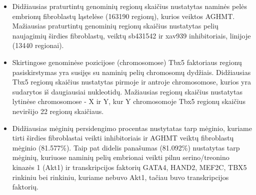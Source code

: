 \documentclass[12pt]{article}
\begin{document}
\begin{itemize}
    \item Didžiausias praturtintų genominių regionų skaičius nustatytas naminės
        pelės embrionų fibroblastų ląstelėse (163190 regionų), kurios veiktos
        AGHMT. Mažiausias praturtintų genominių regionų skaičius nustatytas
        pelių naujagimių širdies fibroblastų, veiktų sb431542 ir xav939
        inhibitoriais, linijoje (13440 regionai).
    \item Skirtingose genominėse pozicijose (chromosomose) Tbx5 faktoriaus
        regionų pasiskirstymas yra susijęs su naminių pelių chromosomų dydžiais.
        Didžiausias Tbx5 regionų skaičius nustatytas pirmoje ir antroje
        chromosomose, kurios yra sudarytos iš daugiausiai nukleotidų.
        Mažiausias regionų skaičius nustatytas lytinėse chromosomose - X ir Y,
        kur Y chromosomoje Tbx5 regionų skaičius neviršijo 22 regionų skaičiaus.
    \item Didžiausias mėginių persidengimo procentas nustytatas tarp mėginio,
        kuriame tirti širdies fibroblastai veikti inhibitoriais ir AGHMT
        veiktų fibroblastų mėginio (81.577\%). Taip pat didelis panašumas
        (81.092\%) nustatytas tarp mėginių, kuriuose naminių pelių embrionai
        veikti pilnu serino/treonino kinazės 1 (Akt1) ir transkripcijos
        faktorių GATA4, HAND2, MEF2C, TBX5 rinkiniu bei rinkiniu, kuriame
        nebuvo Akt1, tačiau buvo transkripcijos faktorių.
\end{itemize}

\newpage

\end{document}
